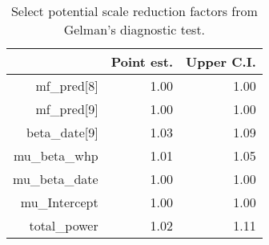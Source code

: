 \begin{table}[h]
\centering
\begin{tabular}{rrr}
  \hline
 & Point est. & Upper C.I. \\ 
  \hline
mf\_pred[8] & 1.00 & 1.00 \\ 
  mf\_pred[9] & 1.00 & 1.00 \\ 
  beta\_date[9] & 1.03 & 1.09 \\ 
  mu\_beta\_whp & 1.01 & 1.05 \\ 
  mu\_beta\_date & 1.00 & 1.00 \\ 
  mu\_Intercept & 1.00 & 1.00 \\ 
  total\_power & 1.02 & 1.11 \\ 
   \hline
\end{tabular}
\caption{Select potential scale reduction factors from Gelman's diagnostic test.} 
\label{tab:gelman}
\end{table}
